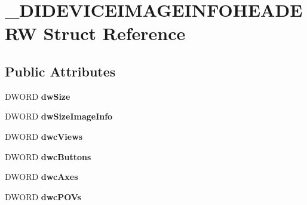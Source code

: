 \hypertarget{struct___d_i_d_e_v_i_c_e_i_m_a_g_e_i_n_f_o_h_e_a_d_e_r_w}{\section{\-\_\-\-D\-I\-D\-E\-V\-I\-C\-E\-I\-M\-A\-G\-E\-I\-N\-F\-O\-H\-E\-A\-D\-E\-R\-W Struct Reference}
\label{struct___d_i_d_e_v_i_c_e_i_m_a_g_e_i_n_f_o_h_e_a_d_e_r_w}
}
\subsection*{Public Attributes}
\begin{DoxyCompactItemize}
\item 
\hypertarget{struct___d_i_d_e_v_i_c_e_i_m_a_g_e_i_n_f_o_h_e_a_d_e_r_w_a060b8c217c4e4559227f2a81c903325f}{D\-W\-O\-R\-D {\bfseries dw\-Size}}\label{struct___d_i_d_e_v_i_c_e_i_m_a_g_e_i_n_f_o_h_e_a_d_e_r_w_a060b8c217c4e4559227f2a81c903325f}

\item 
\hypertarget{struct___d_i_d_e_v_i_c_e_i_m_a_g_e_i_n_f_o_h_e_a_d_e_r_w_ae960c133fc2b5522cc6f4b6f119f95aa}{D\-W\-O\-R\-D {\bfseries dw\-Size\-Image\-Info}}\label{struct___d_i_d_e_v_i_c_e_i_m_a_g_e_i_n_f_o_h_e_a_d_e_r_w_ae960c133fc2b5522cc6f4b6f119f95aa}

\item 
\hypertarget{struct___d_i_d_e_v_i_c_e_i_m_a_g_e_i_n_f_o_h_e_a_d_e_r_w_a8309871e50e8995c22a7e52bebc0d7fc}{D\-W\-O\-R\-D {\bfseries dwc\-Views}}\label{struct___d_i_d_e_v_i_c_e_i_m_a_g_e_i_n_f_o_h_e_a_d_e_r_w_a8309871e50e8995c22a7e52bebc0d7fc}

\item 
\hypertarget{struct___d_i_d_e_v_i_c_e_i_m_a_g_e_i_n_f_o_h_e_a_d_e_r_w_a0ea2290c05af3d9dd476f22ecf6123d3}{D\-W\-O\-R\-D {\bfseries dwc\-Buttons}}\label{struct___d_i_d_e_v_i_c_e_i_m_a_g_e_i_n_f_o_h_e_a_d_e_r_w_a0ea2290c05af3d9dd476f22ecf6123d3}

\item 
\hypertarget{struct___d_i_d_e_v_i_c_e_i_m_a_g_e_i_n_f_o_h_e_a_d_e_r_w_aa38a84dde6f2236555425e2ce37eae62}{D\-W\-O\-R\-D {\bfseries dwc\-Axes}}\label{struct___d_i_d_e_v_i_c_e_i_m_a_g_e_i_n_f_o_h_e_a_d_e_r_w_aa38a84dde6f2236555425e2ce37eae62}

\item 
\hypertarget{struct___d_i_d_e_v_i_c_e_i_m_a_g_e_i_n_f_o_h_e_a_d_e_r_w_a39f3d47f7d84fe382572be2498418623}{D\-W\-O\-R\-D {\bfseries dwc\-P\-O\-Vs}}\label{struct___d_i_d_e_v_i_c_e_i_m_a_g_e_i_n_f_o_h_e_a_d_e_r_w_a39f3d47f7d84fe382572be2498418623}


\end{DoxyCompactItemize}
